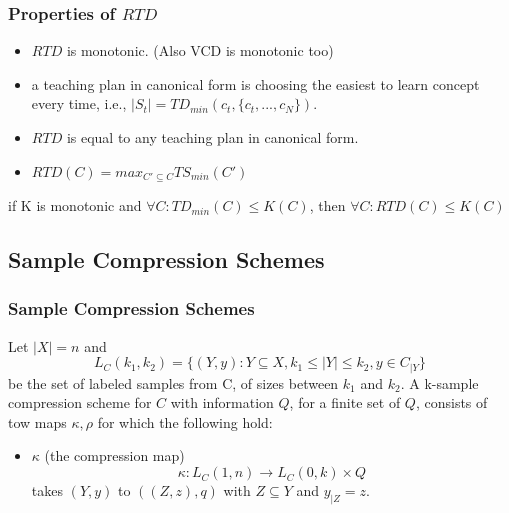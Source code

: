 \documentclass{beamer}
\begin{document}
\begin{frame}
\frametitle{Properties of $RTD$}

\begin{itemize}
    \item $RTD$ is monotonic. (Also VCD is monotonic too)
    \item a teaching plan in canonical form is choosing the easiest to learn concept every time, i.e., $|S_t| = TD_{min}(c_t, \{c_t, ..., c_N\})$.
    \item $RTD$ is equal to any teaching plan in canonical form.
    \item $RTD(C) = max_{C' \subseteq C} TS_{min}(C')$
\end{itemize}

\begin{lemma}\label{lem:monot}
    if K is monotonic and $\forall C: TD_{min}(C) \leq K(C)$, then $\forall C: RTD(C) \leq K(C)$
\end{lemma}

\end{frame}




\subsection{Sample Compression Schemes}
\begin{frame}
\frametitle{Sample Compression Schemes}
\begin{definition}
Let $|X| = n$ and 
\begin{equation*}
L_C(k_1,k_2) = \{(Y,y):Y \subseteq X, k_1\leq |Y| \leq k_2, y \in C_{|Y}\}
\end{equation*}
be the set of labeled samples from C, of sizes between $k_1$ and $k_2$. A k-sample compression scheme for $C$ with information $Q$, for a finite set of $Q$, consists of tow maps $\kappa, \rho$ for which the following hold:
\begin{itemize}
\item 
  $\kappa$ (the compression map)
  \begin{equation*}
  \kappa: L_C(1,n) \to L_C(0,k) \times Q
  \end{equation*}
  takes $(Y, y)$ to $((Z, z),q)$ with $Z\subseteq Y$ and $y_{|Z} = z$.
\end{itemize}

\end{definition}
\end{frame}
\end{document}

